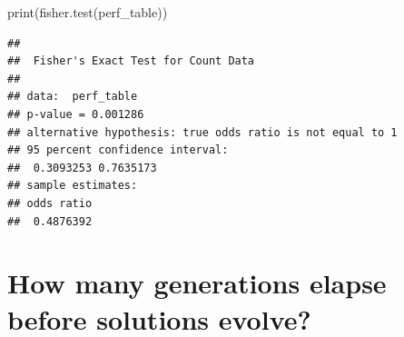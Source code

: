 \documentclass[
]{book}
\newenvironment{Shaded}{\begin{snugshade}}{\end{snugshade}}
\newcommand{\FunctionTok}[1]{\textcolor[rgb]{0.00,0.00,0.00}{#1}}
\newcommand{\NormalTok}[1]{#1}
\begin{document}
\begin{Shaded}
\begin{Highlighting}[]
\FunctionTok{print}\NormalTok{(}\FunctionTok{fisher.test}\NormalTok{(perf\_table))}
\end{Highlighting}
\end{Shaded}

\begin{verbatim}
## 
##  Fisher's Exact Test for Count Data
## 
## data:  perf_table
## p-value = 0.001286
## alternative hypothesis: true odds ratio is not equal to 1
## 95 percent confidence interval:
##  0.3093253 0.7635173
## sample estimates:
## odds ratio 
##  0.4876392
\end{verbatim}

\hypertarget{how-many-generations-elapse-before-solutions-evolve-3}{%
\section{How many generations elapse before solutions evolve?}\label{how-many-generations-elapse-before-solutions-evolve-3}}
\end{document}
